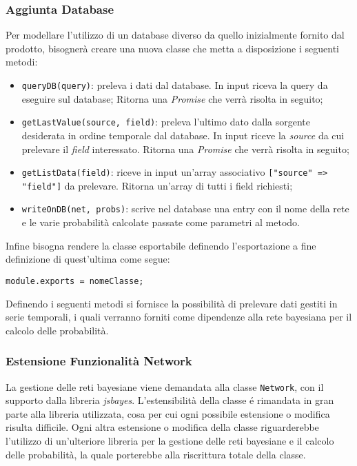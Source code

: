 \subsubsection{Aggiunta Database}\label{ExtAddDB}
Per modellare l'utilizzo di un database diverso da quello inizialmente fornito dal prodotto, bisognerà creare una nuova classe che metta a disposizione i seguenti metodi: 
\begin{itemize}
 \item \texttt{queryDB(query)}: preleva i dati dal database. In input riceva la query da eseguire sul database;
 Ritorna una \textit{Promise} che verrà risolta in seguito;
 \item \texttt{getLastValue(source, field)}: preleva l'ultimo dato dalla sorgente desiderata in ordine temporale dal database. In input riceve la \textit{source} da cui prelevare il \textit{field} interessato. Ritorna una \textit{Promise} che verrà risolta in seguito;
 \item \texttt{getListData(field)}: riceve in input un'array associativo \texttt{["source" => "field"]} da prelevare. 
 Ritorna un'array di tutti i field richiesti;
 \item \texttt{writeOnDB(net, probs)}: scrive nel database una entry con il nome della rete e le varie probabilità calcolate passate come parametri al metodo.
\end{itemize}
Infine bisogna rendere la classe esportabile definendo l'esportazione a fine definizione di quest'ultima come segue: 
\begin{center}
 \texttt{module.exports = nomeClasse;}
\end{center}
Definendo i seguenti metodi si fornisce la possibilità di prelevare dati gestiti in serie temporali, i quali verranno forniti come dipendenze alla rete bayesiana per il calcolo delle probabilità. 

\subsubsection{Estensione Funzionalità Network}
La gestione delle reti bayesiane viene  demandata alla classe \texttt{Network}, con il supporto dalla libreria \textit{jsbayes}. L'estensibilità della classe é rimandata in gran parte alla libreria utilizzata, cosa per cui ogni possibile estensione o modifica risulta difficile. Ogni altra estensione o modifica della classe riguarderebbe l'utilizzo di un'ulteriore libreria per la gestione delle reti bayesiane e il calcolo delle probabilità, la quale porterebbe alla riscrittura totale della classe. 


